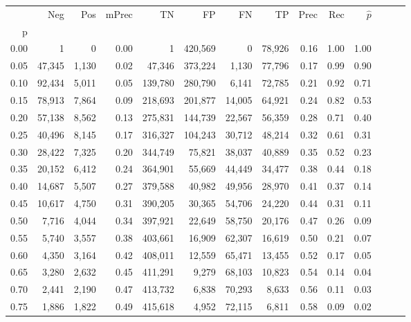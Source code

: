 \begin{tabular}{rrrrrrrrrrrrrr}
\toprule
{} &     Neg &    Pos & mPrec &       TN &       FP &      FN &      TP &  Prec &   Rec & $\hat{p}$ \\
p    &         &        &       &          &          &         &         &       &       &           \\
\midrule
0.00 &       1 &      0 &  0.00 &        1 &  420,569 &       0 &  78,926 &  0.16 &  1.00 &      1.00 \\
0.05 &  47,345 &  1,130 &  0.02 &   47,346 &  373,224 &   1,130 &  77,796 &  0.17 &  0.99 &      0.90 \\
0.10 &  92,434 &  5,011 &  0.05 &  139,780 &  280,790 &   6,141 &  72,785 &  0.21 &  0.92 &      0.71 \\
0.15 &  78,913 &  7,864 &  0.09 &  218,693 &  201,877 &  14,005 &  64,921 &  0.24 &  0.82 &      0.53 \\
0.20 &  57,138 &  8,562 &  0.13 &  275,831 &  144,739 &  22,567 &  56,359 &  0.28 &  0.71 &      0.40 \\
0.25 &  40,496 &  8,145 &  0.17 &  316,327 &  104,243 &  30,712 &  48,214 &  0.32 &  0.61 &      0.31 \\
0.30 &  28,422 &  7,325 &  0.20 &  344,749 &   75,821 &  38,037 &  40,889 &  0.35 &  0.52 &      0.23 \\
0.35 &  20,152 &  6,412 &  0.24 &  364,901 &   55,669 &  44,449 &  34,477 &  0.38 &  0.44 &      0.18 \\
0.40 &  14,687 &  5,507 &  0.27 &  379,588 &   40,982 &  49,956 &  28,970 &  0.41 &  0.37 &      0.14 \\
0.45 &  10,617 &  4,750 &  0.31 &  390,205 &   30,365 &  54,706 &  24,220 &  0.44 &  0.31 &      0.11 \\
0.50 &   7,716 &  4,044 &  0.34 &  397,921 &   22,649 &  58,750 &  20,176 &  0.47 &  0.26 &      0.09 \\
0.55 &   5,740 &  3,557 &  0.38 &  403,661 &   16,909 &  62,307 &  16,619 &  0.50 &  0.21 &      0.07 \\
0.60 &   4,350 &  3,164 &  0.42 &  408,011 &   12,559 &  65,471 &  13,455 &  0.52 &  0.17 &      0.05 \\
0.65 &   3,280 &  2,632 &  0.45 &  411,291 &    9,279 &  68,103 &  10,823 &  0.54 &  0.14 &      0.04 \\
0.70 &   2,441 &  2,190 &  0.47 &  413,732 &    6,838 &  70,293 &   8,633 &  0.56 &  0.11 &      0.03 \\
0.75 &   1,886 &  1,822 &  0.49 &  415,618 &    4,952 &  72,115 &   6,811 &  0.58 &  0.09 &      0.02 \\

\end{tabular}
